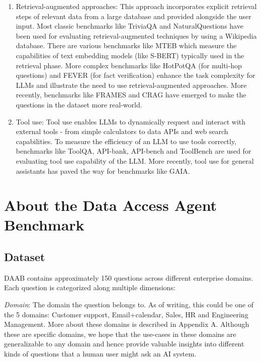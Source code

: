 \documentclass[11pt,a4paper]{article}
\begin{document}
\begin{enumerate}
\item Retrieval-augmented approaches\cite{realm,rag,trillion}: This approach incorporates explicit retrieval steps of relevant data from a large database and provided alongside the user input. Most classic benchmarks like TriviaQA\cite{triviaqa} and NaturalQuestions\cite{naturalq} have been used for evaluating retrieval-augmented techniques by using a Wikipedia database. There are various benchmarks like MTEB\cite{mteb} which measure the capabilities of text embedding models (like S-BERT\cite{sbert}) typically used in the retrieval phase. More complex benchmarks like HotPotQA\cite{hotpotqa} (for multi-hop questions) and FEVER\cite{fever} (for fact verification) enhance the task complexity for LLMs and illustrate the need to use retrieval-augmented approaches. More recently, benchmarks like FRAMES\cite{frames} and CRAG\cite{crag} have emerged to make the questions in the dataset more real-world.

\item Tool use\cite{toolformer,react}: Tool use enables LLMs to dynamically request and interact with external tools - from simple calculators to data APIs and web search capabilities. To measure the efficiency of an LLM to use tools correctly, benchmarks like ToolQA\cite{toolqa}, API-bank\cite{api-bank}, API-bench\cite{api-bench} and ToolBench\cite{tool-bench} are used for evaluating tool use capability of the LLM. More recently, tool use for general assistants has paved the way for benchmarks like GAIA\cite{gaia}.
\end{enumerate}


\section{About the Data Access Agent Benchmark}

\subsection{Dataset}
DAAB contains approximately 150 questions across different enterprise domains. Each question is categorized along multiple dimensions:

\textit{Domain}: The domain the question belongs to. As of writing, this could be one of the 5 domains: Customer support, Email+calendar, Sales, HR and Engineering Management. More about these domains is described in Appendix A. Although these are specific domains, we hope that the use-cases in these domains are generalizable to any domain and hence provide valuable insights into different kinds of questions that a human user might ask an AI system. \\
\end{document}
